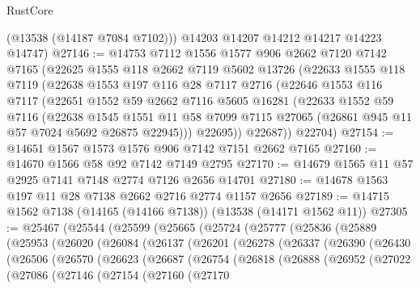 \begin{lexlean}{RustCore}
\begin{coremodule}
        (@13538 (@14187 @7084 @7102)))
      @14203
      @14207
      @14212
      @14217
      @14223
      @14747)
@27146 := @14753
    @7112
    @1556
    @1577
    @906
    @2662
    @7120
    @7142
    @7165
    (@22625
      @1555
      @118
      @2662
      @7119
      @5602
      @13726
      (@22633
        @1555
        @118
        @7119
        (@22638
          @1553
          @197
          @116
          @28
          @7117
          @2716
          (@22646
            @1553
            @116
            @7117
            (@22651
              @1552
              @59
              @2662
              @7116
              @5605
              @16281
              (@22633
                @1552
                @59
                @7116
                (@22638
                  @1545
                  @1551
                  @11
                  @58
                  @7099
                  @7115
                  @27065
                  (@26861 @945 @11 @57 @7024 @5692 @26875 @22945)))
              @22695))
          @22687))
      @22704)
@27154 := @14651 @1567 @1573 @1576 @906 @7142 @7151 @2662 @7165
@27160 := @14670 @1566 @58 @92 @7142 @7149 @2795
@27170 := @14679 @1565 @11 @57 @2925 @7141 @7148 @2774 @7126 @2656 @14701
@27180 := @14678 @1563 @197 @11 @28 @7138 @2662 @2716 @2774 @1157 @2656
@27189 := @14715 @1562 @7138 (@14165 (@14166 @7138)) (@13538 (@14171 @1562 @11))
@27305 := @25467
    (@25544
      (@25599
        (@25665
          (@25724
            (@25777
              (@25836
                (@25889
                  (@25953
                    (@26020
                      (@26084
                        (@26137
                          (@26201
                            (@26278
                              (@26337
                                (@26390
                                  (@26430
                                    (@26506
                                      (@26570
                                        (@26623
                                          (@26687
                                            (@26754
                                              (@26818
                                                (@26888
                                                  (@26952
                                                    (@27022
                                                      (@27086
                                                        (@27146
                                                          (@27154
                                                            (@27160
                                                              (@27170

\end{coremodule}
\end{lexlean}
